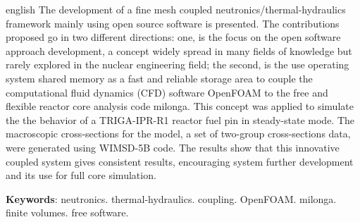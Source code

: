 \documentclass[12pt,openright,twoside,a4paper,english,french,spanish,brazil]{abntex2}
\begin{document}
\begin{resumo}[Abstract]
 \begin{otherlanguage*}{english}
   The development of a fine mesh coupled neutronics/thermal-hydraulics framework mainly using open source software is presented.
   The contributions proposed go in two different directions: one, is the focus on the open software approach development, a concept
   widely spread in many fields of knowledge but rarely explored in the nuclear engineering field; the second, is the use operating
   system shared memory as a fast and reliable storage area to couple the computational fluid dynamics (CFD) software OpenFOAM to the
   free and flexible reactor core analysis code milonga. This concept was applied to simulate the the behavior of a TRIGA-IPR-R1 reactor
   fuel pin in steady-state mode. The macroscopic cross-sections for the model, a set of two-group cross-sections data, were generated using WIMSD-5B code.
   The results show that this innovative coupled system gives consistent results, encouraging system further development and its use for full core simulation.
   
   \vspace{\onelineskip}
% 
   \noindent 
   \textbf{Keywords}: neutronics. thermal-hydraulics. coupling. OpenFOAM. milonga. finite volumes. free software.
 \end{otherlanguage*}
\end{resumo}

% 
% 

%  
% 



\listoffigures*
\cleardoublepage
\end{document}
